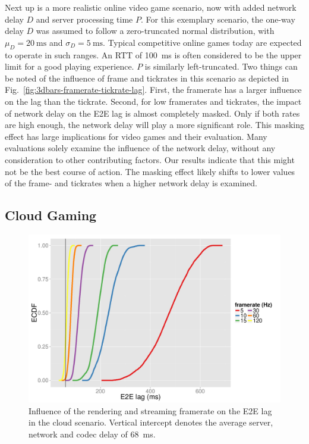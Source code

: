 Next up is a more realistic online video game scenario, now with added network delay $D$ and server processing time $P$. For this exemplary scenario, the one-way delay $D$ was assumed to follow a zero-truncated normal distribution, with $\mu_D = \SI{20}{\milli\second}$ and $\sigma_D = \SI{5}{\milli\second}$. Typical competitive online games today are expected to operate in such ranges. An \acrshort{RTT} of \SI{100}{\milli\second} is often considered to be the upper limit for a good playing experience. $P$ is similarly left-truncated. Two things can be noted of the influence of frame and tickrates in this scenario as depicted in Fig.~\ref{fig:3dbars-framerate-tickrate-lag}. First, the framerate has a larger influence on the lag than the tickrate. Second, for low framerates and tickrates, the impact of network delay on the \gls{E2E} lag is almost completely masked. Only if both rates are high enough, the network delay will play a more significant role. This masking effect has large implications for video games and their evaluation. Many evaluations solely examine the influence of the network delay, without any consideration to other contributing factors. Our results indicate that this might not be the best course of action. The masking effect likely shifts to lower values of the frame- and tickrates when a higher network delay is examined.



\subsection{Cloud Gaming}

\begin{figure}[!t]
	\centering
	\includegraphics[width=1.0\columnwidth]{../../../simulation/visualization/cloudgaming-lag-cdf.pdf}
	\caption{Influence of the rendering and streaming framerate on the \gls{E2E} lag in the cloud scenario. Vertical intercept denotes the average server, network and codec delay of \SI{68}{\milli\second}.}
\label{fig:cloud-e2e-delay-sim}
\end{figure}

